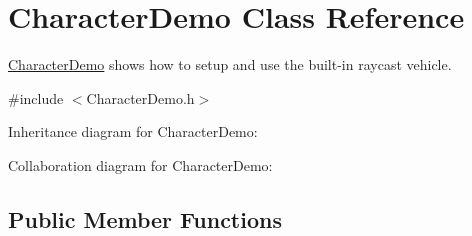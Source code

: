 \hypertarget{class_character_demo}{\section{Character\+Demo Class Reference}
\label{class_character_demo}
}


\hyperlink{class_character_demo}{Character\+Demo} shows how to setup and use the built-\/in raycast vehicle.  




{\ttfamily \#include $<$Character\+Demo.\+h$>$}



Inheritance diagram for Character\+Demo\+:


Collaboration diagram for Character\+Demo\+:
\subsection*{Public Member Functions}
